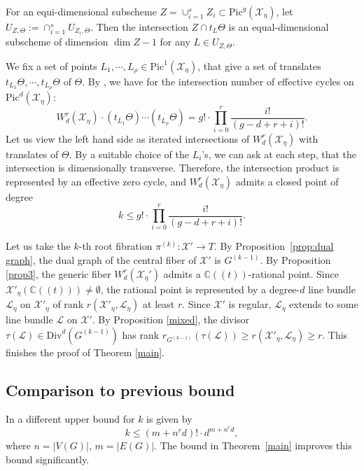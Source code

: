 \documentclass[11pt]{amsart}
\newcommand{\cX}{\mathcal X}
\begin{document}
For an equi-dimensional subscheme $Z=\cup_{i=1}^s Z_i\subset\mathrm{Pic}^g(\cX_\eta)$, let $U_{Z,\Theta}:=\cap_{i=1}^s U_{Z_i,\Theta}$. Then the intersection $Z\cap t_L\Theta$ is an equal-dimensional subscheme of dimension $\dim Z-1$ for any $L\in U_{Z,\Theta}$.

We fix a set of points $L_1,\cdots,L_\rho\in \mathrm{Pic}^1(\cX_\eta)$, that give a set of translates $t_{L_1}\Theta,\cdots,t_{L_\rho}\Theta$ of $\Theta$. By \cite[Theorem V.1.3]{MR770932}, we have for the intersection number of effective cycles on $\mathrm{Pic}^d(\cX_\eta)$: $$W_d^r(\cX_\eta)\cdot (t_{L_1}\Theta)\cdots(t_{L_\rho}\Theta)=g!\cdot\prod_{i=0}^r\frac{i!}{(g-d+r+i)!}.$$Let us view the left hand side as iterated intersections of $W_d^r(\cX_\eta)$ with translates of $\Theta$.
By a suitable choice of the $L_i$'s, we can ask at each step, that the intersection is dimensionally transverse. Therefore, the intersection product is represented by an effective zero cycle, and $W_d^r(\cX_\eta)$ admits a closed point of degree $$k \leq g!\cdot\prod_{i=0}^r\frac{i!}{(g-d+r+i)!}.$$

Let us take the $k$-th root fibration $\pi^{(k)}\colon\mathcal{X}'\to T$. By Proposition~\ref{prop:dual graph}, the dual graph of the central fiber of $\cX'$ is $G^{(k - 1)}$. By Proposition \ref{prop3}, the generic fiber $W_d^r(\cX_\eta')$ admits a $\mathbb{C}((t))$-rational point. Since $\cX'_\eta(\mathbb{C}((t)))\neq\emptyset$, the rational point is represented by a degree-$d$ line bundle $\mathcal{L}_\eta$ on $\cX'_\eta$ of rank $r(\cX'_\eta,\mathcal{L}_{\eta})$ at least $r$. Since $\mathcal{X}'$ is regular, $\mathcal{L}_\eta$ extends to some line bundle $\mathcal{L}$ on $\mathcal{X}'$. By Proposition \ref{mixed}, the divisor $\tau(\mathcal{L})\in\mathrm{Div}^d(G^{(k - 1)})$ has rank $r_{G^{(k - 1)}}(\tau(\mathcal{L}))\geq r(\cX'_\eta,\mathcal{L}_\eta)\geq r$. This finishes the proof of Theorem \ref{main}.

\subsection{Comparison to previous bound} \label{subsec:comparison}

In \cite[Remark 3.7]{MR4397104} a different upper bound for $k$ is given by \begin{equation} \label{eq:previous bound}
    k \leq (m+n^r d)!\cdot d^{m+n^r d},
\end{equation} where $n=|V(G)|$, $m=|E(G)|$.
The bound in Theorem~\ref{main} improves this bound significantly. 
\end{document}
